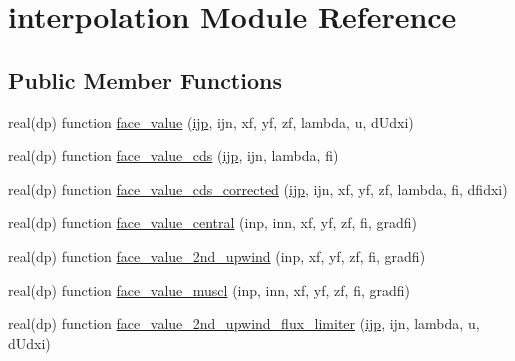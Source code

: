 \hypertarget{classinterpolation}{\section{interpolation Module Reference}
\label{classinterpolation}
}
\subsection*{Public Member Functions}
\begin{DoxyCompactItemize}
\item 
real(dp) function \hyperlink{classinterpolation_a4906644e7abbc98fe9e87749dd7ca907}{face\-\_\-value} (\hyperlink{CourantNo_8h_accea320a458bb8759c7ece360e05ddf4}{ijp}, ijn, xf, yf, zf, lambda, u, d\-Udxi)
\item 
real(dp) function \hyperlink{classinterpolation_a2955420d11e2fbe30a99e4fefc374759}{face\-\_\-value\-\_\-cds} (\hyperlink{CourantNo_8h_accea320a458bb8759c7ece360e05ddf4}{ijp}, ijn, lambda, fi)
\item 
real(dp) function \hyperlink{classinterpolation_aebfa91890374b7e5e59f1342aa091a58}{face\-\_\-value\-\_\-cds\-\_\-corrected} (\hyperlink{CourantNo_8h_accea320a458bb8759c7ece360e05ddf4}{ijp}, ijn, xf, yf, zf, lambda, fi, dfidxi)
\item 
real(dp) function \hyperlink{classinterpolation_ab244a4491720b6c92b4f5e6e2539e06c}{face\-\_\-value\-\_\-central} (inp, inn, xf, yf, zf, fi, gradfi)
\item 
real(dp) function \hyperlink{classinterpolation_aad6795e9522c835edaf6484a063343cc}{face\-\_\-value\-\_\-2nd\-\_\-upwind} (inp, xf, yf, zf, fi, gradfi)
\item 
real(dp) function \hyperlink{classinterpolation_a69b9fafef9c399b908b8c8b6b7c7862d}{face\-\_\-value\-\_\-muscl} (inp, inn, xf, yf, zf, fi, gradfi)
\item 
real(dp) function \hyperlink{classinterpolation_af5ae37f4a0cb45e47998b454659a6eb9}{face\-\_\-value\-\_\-2nd\-\_\-upwind\-\_\-flux\-\_\-limiter} (\hyperlink{CourantNo_8h_accea320a458bb8759c7ece360e05ddf4}{ijp}, ijn, lambda, u, d\-Udxi)
\end{DoxyCompactItemize}


